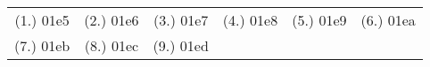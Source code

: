 \begin{eocexercises}{}
\begin{enumerate}

\end{enumerate}






\par \practiceinfo
\par \begin{tabular}[h]{cccccc}
(1.)	01e5	&
(2.)	01e6	&
(3.)	01e7	&
(4.)	01e8	&
(5.)	01e9	&
(6.)	01ea	\\ %
(7.)	01eb	&
(8.)	01ec	&
(9.)	01ed	&
\end{tabular}
\end{eocexercises}
